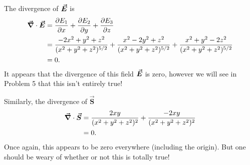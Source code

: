 \documentclass[12pt]{article} %
\begin{document}
\begin{solution}
    The divergence of $\boldsymbol{\vec{E}}$ is
    \begin{align*}
        \boldsymbol{\vec{\nabla}} \cdot \boldsymbol{\vec{E}} &= \frac{\partial E_1}{\partial x} + \frac{\partial E_2}{\partial y} + \frac{\partial E_3}{\partial z}\\
        &= \frac{-2x^2+y^2+z^2}{(x^2+y^2+z^2)^{5/2}} + \frac{x^2-2y^2+z^2}{(x^2+y^2+z^2)^{5/2}} + \frac{x^2+y^2-2z^2}{(x^2+y^2+z^2)^{5/2}}\\
        &= 0.
    \end{align*}
    It appears that the divergence of this field $\boldsymbol{\vec{E}}$ is zero, however we will see in Problem 5 that this isn't entirely true!
    
    Similarly, the divergence of $\boldsymbol{\vec{S}}$
    \begin{align*}
        \boldsymbol{\vec{\nabla}} \cdot \boldsymbol{\vec{S}} &= \frac{2xy}{(x^2+y^2+z^2)^2} + \frac{-2xy}{(x^2+y^2+z^2)^2}\\
        &=0.
    \end{align*}
    Once again, this appears to be zero everywhere (including the origin). But one should be weary of whether or not this is totally true!
   
\end{solution}
\end{document}

